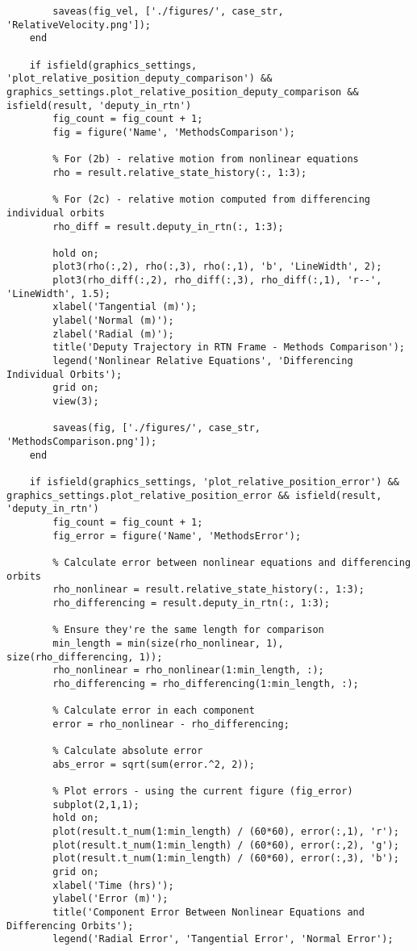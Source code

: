\begin{lstlisting}
        saveas(fig_vel, ['./figures/', case_str, 'RelativeVelocity.png']);
    end
    
    if isfield(graphics_settings, 'plot_relative_position_deputy_comparison') && graphics_settings.plot_relative_position_deputy_comparison && isfield(result, 'deputy_in_rtn')
        fig_count = fig_count + 1;
        fig = figure('Name', 'MethodsComparison');
        
        % For (2b) - relative motion from nonlinear equations
        rho = result.relative_state_history(:, 1:3);
        
        % For (2c) - relative motion computed from differencing individual orbits
        rho_diff = result.deputy_in_rtn(:, 1:3);
        
        hold on;
        plot3(rho(:,2), rho(:,3), rho(:,1), 'b', 'LineWidth', 2);
        plot3(rho_diff(:,2), rho_diff(:,3), rho_diff(:,1), 'r--', 'LineWidth', 1.5);
        xlabel('Tangential (m)');
        ylabel('Normal (m)');
        zlabel('Radial (m)');
        title('Deputy Trajectory in RTN Frame - Methods Comparison');
        legend('Nonlinear Relative Equations', 'Differencing Individual Orbits');
        grid on;
        view(3);
        
        saveas(fig, ['./figures/', case_str, 'MethodsComparison.png']);
    end
    
    if isfield(graphics_settings, 'plot_relative_position_error') && graphics_settings.plot_relative_position_error && isfield(result, 'deputy_in_rtn')
        fig_count = fig_count + 1;
        fig_error = figure('Name', 'MethodsError');
        
        % Calculate error between nonlinear equations and differencing orbits
        rho_nonlinear = result.relative_state_history(:, 1:3);
        rho_differencing = result.deputy_in_rtn(:, 1:3);
        
        % Ensure they're the same length for comparison
        min_length = min(size(rho_nonlinear, 1), size(rho_differencing, 1));
        rho_nonlinear = rho_nonlinear(1:min_length, :);
        rho_differencing = rho_differencing(1:min_length, :);
        
        % Calculate error in each component
        error = rho_nonlinear - rho_differencing;
        
        % Calculate absolute error
        abs_error = sqrt(sum(error.^2, 2));
        
        % Plot errors - using the current figure (fig_error)
        subplot(2,1,1);
        hold on;
        plot(result.t_num(1:min_length) / (60*60), error(:,1), 'r');
        plot(result.t_num(1:min_length) / (60*60), error(:,2), 'g');
        plot(result.t_num(1:min_length) / (60*60), error(:,3), 'b');
        grid on;
        xlabel('Time (hrs)');
        ylabel('Error (m)');
        title('Component Error Between Nonlinear Equations and Differencing Orbits');
        legend('Radial Error', 'Tangential Error', 'Normal Error');
        

\end{lstlisting}
